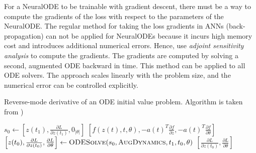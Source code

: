 For a \gls{NeuralODE} to be trainable with gradient descent, there must be a way to compute the gradients of the loss with respect to the parameters of the \gls{NeuralODE}.
The regular method for taking the loss gradients in \glspl{ANN} (back-propagation) can not be applied for \glspl{NeuralODE} because it incurs high memory cost and introduces additional numerical errors.
Hence, \citeauthor{chenNeuralOrdinaryDifferential2019} \cite{chenNeuralOrdinaryDifferential2019} use \textit{adjoint sensitivity analysis} to compute the gradients.
The gradients are computed by solving a second, augmented \gls{ODE} backward in time.
This method can be applied to all \gls{ODE} solvers.
The approach scales linearly with the problem size, and the numerical error can be controlled explicitly.

\begin{algorithm}[h]
    \caption{Reverse-mode derivative of an ODE initial value problem. Algorithm is taken from \citeauthor{chenNeuralOrdinaryDifferential2019} \cite{chenNeuralOrdinaryDifferential2019})}
    \label{alg:neural-ode-reverse-mode-diff}
    \begin{algorithmic}
            \State $s_0 \gets \left[z(t_1), \frac{\partial L}{\partial z(t_1)}, 0_{|\theta|}\right]$
                \State \Return $\left[f(z(t), t, \theta), -a(t)^T\frac{\partial f}{\partial z}, -a(t)^T\frac{\partial f}{\partial \theta}\right]$
            \EndFunction
            \State $\left[z(t_0), \frac{\partial L}{\partial z(t_0)}, \frac{\partial L}{\partial \theta}\right] \gets \Call{ODESolve}{s_0, \textproc{AugDynamics}, t_1, t_0, \theta}$
            \State \Return $\left[\frac{\partial L}{\partial z(t_0)}, \frac{\partial L}{\partial \theta}\right]$
        \EndFunction
    \end{algorithmic}
\end{algorithm}

